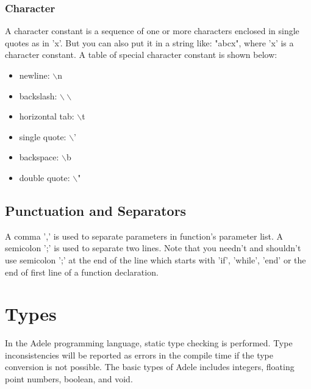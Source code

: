 \documentclass[11pt,letterpaper]{article}
\begin{document}
\subsubsection {Character}
A character constant is a sequence of one or more characters enclosed in single quotes as in 'x'. But you can also put it in a string like: "abcx", where 'x' is a character constant. A table of special character constant is shown below:
\begin{itemize}
	\item newline: $\backslash$n
	\item backslash: $\backslash\backslash$               
	\item horizontal tab: $\backslash$t         
    \item single quote: $\backslash$'         
    \item backspace: $\backslash$b             
    \item double quote: $\backslash$"  
\end{itemize}

\subsection {Punctuation and Separators}
A comma ',' is used to separate parameters in function's parameter list. A semicolon ';' is used to separate two lines. Note that you needn't and shouldn't use semicolon ';' at the end of the line which starts with 'if', 'while', 'end' or the end of first line of a function declaration. 

\section {Types}

In the Adele programming language, static type checking is performed. Type inconsistencies will be reported as errors in the compile time if the type conversion is not possible. The basic types of Adele includes integers, floating point numbers, boolean, and void.
\end{document}
